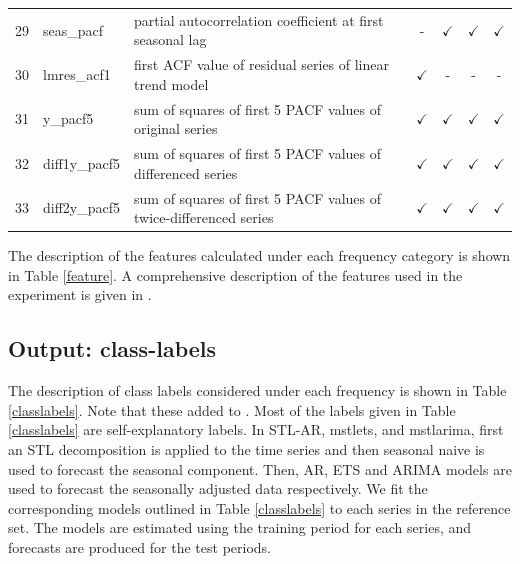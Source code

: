 \documentclass[11pt,a4paper,]{article}
\def\yes{$\checkmark$}
\begin{document}
\begin{table}[!htp]
\begin{tabular}{llp{}cccc}
29 & seas\_pacf     & partial autocorrelation coefficient at first seasonal lag & -     & \yes & \yes & \yes\\
30 & lmres\_acf1    & first ACF value of residual series of linear trend model                                & \yes  & - & - & -\\
31 & y\_pacf5       & sum of squares of first 5 PACF values of original series                                & \yes  & \yes & \yes & \yes\\
32 & diff1y\_pacf5  & sum of squares of first 5 PACF values of differenced series                             & \yes  & \yes & \yes & \yes\\
33 & diff2y\_pacf5  & sum of squares of first 5 PACF values of twice-differenced series                       & \yes  & \yes & \yes & \yes\\
\bottomrule
\end{tabular}
\end{table}

The description of the features calculated under each frequency category is shown in Table \ref{feature}. A comprehensive description of the features used in the experiment is given in \textcite{fforms}.

\hypertarget{output-class-labels}{%
\subsection{Output: class-labels}\label{output-class-labels}}

The description of class labels considered under each frequency is shown in Table \ref{classlabels}. Note that these added to \textcite{fforms}. Most of the labels given in Table \ref{classlabels} are self-explanatory labels. In STL-AR, mstlets, and mstlarima, first an STL decomposition is applied to the time series and then seasonal naive is used to forecast the seasonal component. Then, AR, ETS and ARIMA models are used to forecast the seasonally adjusted data respectively. We fit the corresponding models outlined in Table \ref{classlabels} to each series in the reference set. The models are estimated using the training period for each series, and forecasts are produced for the test periods.
\end{document}
